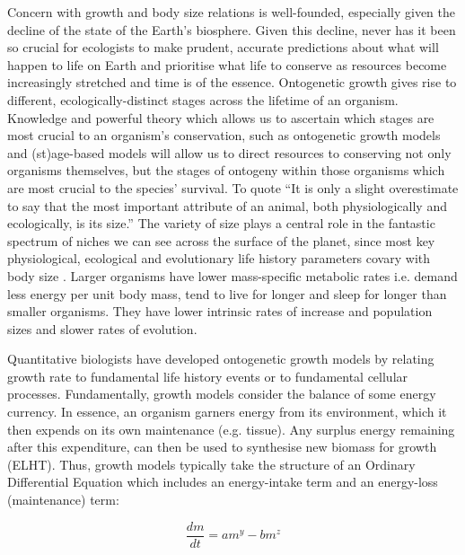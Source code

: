 \documentclass[a4paper]{article} %
\begin{document}
        Concern with growth and body size relations is well-founded, especially given the decline of the state of the Earth's biosphere. Given this decline, never has it been so crucial for ecologists to make prudent, accurate predictions about what will happen to life on Earth and prioritise what life to conserve as resources become increasingly stretched and time is of the essence. Ontogenetic growth gives rise to different, ecologically-distinct stages across the lifetime of an organism. Knowledge and powerful theory which allows us to ascertain which stages are most crucial to an organism's conservation, such as ontogenetic growth models and (st)age-based models will allow us to direct resources to conserving not only organisms themselves, but the stages of ontogeny within those organisms which are most crucial to the species' survival. To quote \cite{Bartholomew1981} ``It is only a slight overestimate to say that the most important attribute of an animal, both physiologically and ecologically, is its size.'' The variety of size plays a central role in the fantastic spectrum of niches we can see across the surface of the planet, since most key physiological, ecological and evolutionary life history parameters covary with body size \autocite{peters1983, brown2000-scaling-book,schmidt1984scaling,Marshall2019b}. Larger organisms have lower mass-specific metabolic rates i.e. demand less energy per unit body mass, tend to live for longer and sleep for longer than smaller organisms. They have lower intrinsic rates of increase and population sizes and slower rates of evolution. 

        Quantitative biologists have developed ontogenetic growth models by relating growth rate to fundamental life history events or to fundamental cellular processes. Fundamentally, growth models consider the balance of some energy currency. In essence, an organism garners energy from its environment, which it then expends on its own maintenance (e.g. tissue). Any surplus energy remaining after this expenditure, can then be used to synthesise new biomass for growth (ELHT). Thus, growth models typically take the structure of an Ordinary Differential Equation which includes an energy-intake term and an energy-loss (maintenance) term:

        \begin{equation}
            \frac{dm}{dt} = am^y - bm^z
        \end{equation}
        
\end{document}
